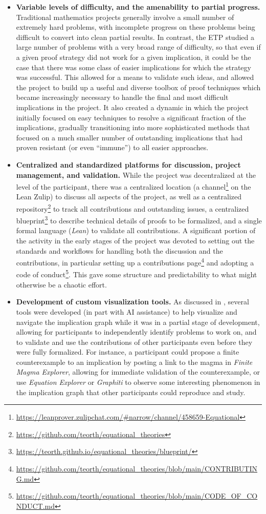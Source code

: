 \begin{itemize}
\item \textbf{Variable levels of difficulty, and the amenability to partial progress.}  Traditional mathematics projects generally involve a small number of extremely hard problems, with incomplete progress on these problems being difficult to convert into clean partial results.  In contrast, the ETP studied a large number of problems with a very broad range of difficulty, so that even if a given proof strategy did not work for a given implication, it could be the case that there was some class of easier implications for which the strategy was successful.  This allowed for a means to validate such ideas, and allowed the project to build up a useful and diverse toolbox of proof techniques which became increasingly necessary to handle the final and most difficult implications in the project.  It also created a dynamic in which the project initially focused on easy techniques to resolve a significant fraction of the implications, gradually transitioning into more sophisticated methods that focused on a much smaller number of outstanding implications that had proven resistant (or even ``immune'') to all easier approaches.
\item \textbf{Centralized and standardized platforms for discussion, project management, and validation.}  While the project was decentralized at the level of the participant, there was a centralized location (a channel\footnote{\url{https://leanprover.zulipchat.com/\#narrow/channel/458659-Equational}} on the Lean Zulip) to discuss all aspects of the project, as well as a centralized repository\footnote{\url{https://github.com/teorth/equational_theories}} to track all contributions and outstanding issues, a centralized blueprint\footnote{\url{https://teorth.github.io/equational_theories/blueprint/}} to describe technical details of proofs to be formalized, and a single formal language (\emph{Lean}) to validate all contributions. A significant portion of the activity in the early stages of the project was devoted to setting out the standards and workflows for handling both the discussion and the contributions, in particular setting up a contributions page\footnote{\url{https://github.com/teorth/equational_theories/blob/main/CONTRIBUTING.md}} and adopting a code of conduct\footnote{\url{https://github.com/teorth/equational_theories/blob/main/CODE_OF_CONDUCT.md}}.  This gave some structure and predictability to what might otherwise be a chaotic effort.
\item \textbf{Development of custom visualization tools.}  As discussed in , several tools were developed (in part with AI assistance) to help visualize and navigate the implication graph while it was in a partial stage of development, allowing for participants to independently identify problems to work on, and to validate and use the contributions of other participants even before they were fully formalized.  For instance, a participant could propose a finite counterexample to an implication by posting a link to the magma in \emph{Finite Magma Explorer}, allowing for immediate validation of the counterexample, or use \emph{Equation Explorer} or \emph{Graphiti} to observe some interesting phenomenon in the implication graph that other participants could reproduce and study.

\end{itemize}
